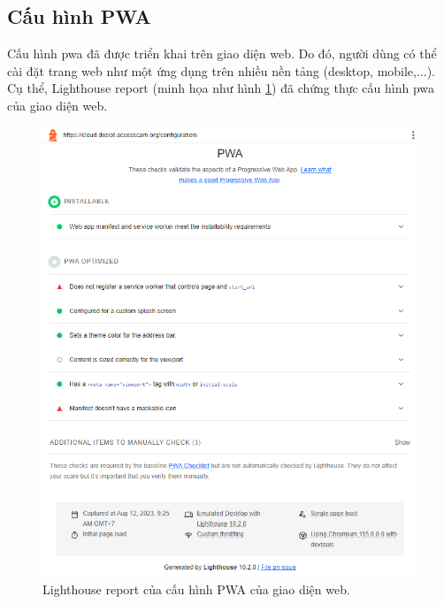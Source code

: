 \subsection{Cấu hình PWA}

Cấu hình \acrshort{pwa} đã được triển khai trên giao diện web. Do đó, người dùng có thể cài đặt trang web như một ứng dụng trên nhiều nền tảng (desktop, mobile,...). Cụ thể, Lighthouse report (minh họa như hình \ref{fig:lighthouse-report}) đã chứng thực cấu hình \acrshort{pwa} của giao diện web.

\begin{figure}[htp]
\centering
\captionsetup{justification=centering,margin=2cm}
\includegraphics[width=1.0\linewidth, frame]{images/fig-lighthouse-report.png}
\caption{Lighthouse report của cấu hình PWA của giao diện web.}
\label{fig:lighthouse-report}
\end{figure}